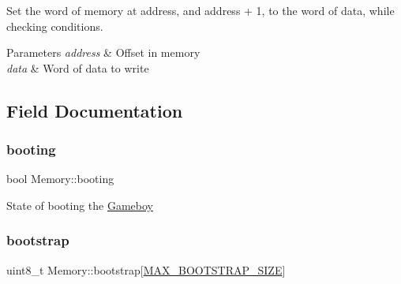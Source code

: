 Set the word of memory at address, and address + 1, to the word of data, while checking conditions. 


\begin{DoxyParams}{Parameters}
{\em address} & Offset in memory \\
\hline
{\em data} & Word of data to write \\
\hline
\end{DoxyParams}


\subsection{Field Documentation}
\mbox{\label{classMemory_a0fe4ff2902803cdbbb5922f2226e663b}} 
\subsubsection{\texorpdfstring{booting}{booting}}
{\footnotesize\ttfamily bool Memory\+::booting\hspace{0.3cm}{\ttfamily [private]}}

State of booting the \mbox{\hyperlink{classGameboy}{Gameboy}} \mbox{\label{classMemory_a8be148954eaf056979fc71314a794587}} 
\subsubsection{\texorpdfstring{bootstrap}{bootstrap}}
{\footnotesize\ttfamily uint8\+\_\+t Memory\+::bootstrap\mbox{[}\mbox{\hyperlink{memory_8hpp_a31b15d7c0080f90bfd04277cf53e30ff}{M\+A\+X\+\_\+\+B\+O\+O\+T\+S\+T\+R\+A\+P\+\_\+\+S\+I\+ZE}}\mbox{]}\hspace{0.3cm}{\ttfamily [private]}}

